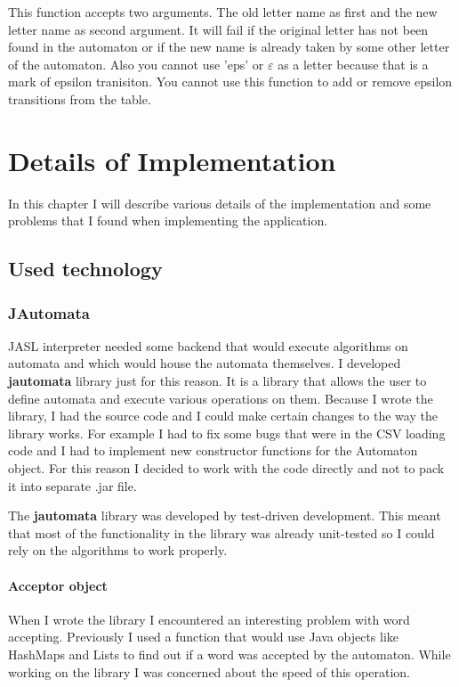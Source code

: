 \documentclass{ctuthesis}
\begin{document}
This function accepts two arguments. The old letter name as first and the new letter name as second argument. It will fail if the original letter has not been found in the automaton or if the new name is already taken by some other letter of the automaton. Also you cannot use 'eps' or $\varepsilon$ as a letter because that is a mark of epsilon tranisiton. You cannot use this function to add or remove epsilon transitions from the table.

\chapter{Details of Implementation}
In this chapter I will describe various details of the implementation and some problems that I found when implementing the application.

\section{Used technology}
\subsection{JAutomata}
JASL interpreter needed some backend that would execute algorithms on automata and which would house the automata themselves. I developed \textbf{jautomata} library just for this reason. It is a library that allows the user to define automata and execute various operations on them. Because I wrote the library, I had the source code and I could make certain changes to the way the library works. For example I had to fix some bugs that were in the CSV loading code and I had to implement new constructor functions for the Automaton object. For this reason I decided to work with the code directly and not to pack it into separate .jar file. 

The \textbf{jautomata} library was developed by test-driven development. This meant that most of the functionality in the library was already unit-tested so I could rely on the algorithms to work properly. 

\subsubsection{Acceptor object}
When I wrote the library I encountered an interesting problem with word accepting. Previously I used a function that would use Java objects like HashMaps and Lists to find out if a word was accepted by the automaton. While working on the library I was concerned about the speed of this operation. 
\end{document}
